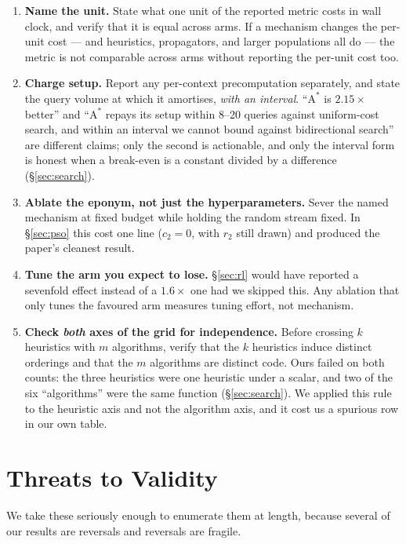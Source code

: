 \documentclass[11pt]{article}
\begin{document}
\begin{enumerate}[leftmargin=1.6em, itemsep=2pt]
\item \textbf{Name the unit.} State what one unit of the reported metric costs in wall clock, and
  verify that it is equal across arms. If a mechanism changes the per-unit cost --- and heuristics,
  propagators, and larger populations all do --- the metric is not comparable across arms without
  reporting the per-unit cost too.
\item \textbf{Charge setup.} Report any per-context precomputation separately, and state the query
  volume at which it amortises, \emph{with an interval}. ``$\mathrm{A}^*$ is $2.15\times$ better''
  and ``$\mathrm{A}^*$ repays its setup within 8--20 queries against uniform-cost search, and within
  an interval we cannot bound against bidirectional search'' are different claims; only the second
  is actionable, and only the interval form is honest when a break-even is a constant divided by a
  difference (\S\ref{sec:search}).
\item \textbf{Ablate the eponym, not just the hyperparameters.} Sever the named mechanism at fixed
  budget while holding the random stream fixed. In \S\ref{sec:pso} this cost one line
  ($c_2 = 0$, with $r_2$ still drawn) and produced the paper's cleanest result.
\item \textbf{Tune the arm you expect to lose.} \S\ref{sec:rl} would have reported a sevenfold
  effect instead of a $1.6\times$ one had we skipped this. Any ablation that only tunes the
  favoured arm measures tuning effort, not mechanism.
\item \textbf{Check \emph{both} axes of the grid for independence.} Before crossing $k$
  heuristics with $m$ algorithms, verify that the $k$ heuristics induce distinct orderings and that
  the $m$ algorithms are distinct code. Ours failed on both counts: the three heuristics were one
  heuristic under a scalar, and two of the six ``algorithms'' were the same function
  (\S\ref{sec:search}). We applied this rule to the heuristic axis and not the algorithm axis, and
  it cost us a spurious row in our own table.
\end{enumerate}

\section{Threats to Validity}
\label{sec:threats}

We take these seriously enough to enumerate them at length, because several of our results are
reversals and reversals are fragile.
\end{document}
